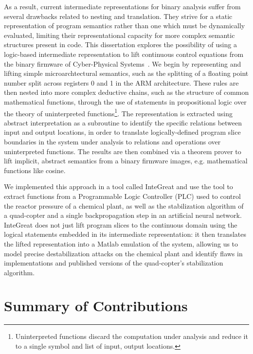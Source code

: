 As a result, current intermediate representations for binary analysis suffer from several drawbacks related to nesting and translation.
They strive for a static representation of program semantics rather than one which must be dynamically evaluated, limiting their representational capacity for more complex semantic structures present in code.
This dissertation explores the possibility of using a logic-based intermediate representation to lift continuous control equations from the binary firmware of Cyber-Physical Systems~\cite{letichevsky2017cyber}.
We begin by representing and lifting simple microarchtectural semantics, such as the splitting of a floating point number split across registers 0 and 1 in the ARM architecture.
These rules are then nested into more complex deductive chains, such as the structure of common mathematical functions, through the use of statements in propositional logic over the theory of uninterpreted functions\footnote{Uninterpreted functions discard the computation under analysis and reduce it to a single symbol and list of input, output locations.}.
The representation is extracted using abstract interpretation as a subroutine to identify the specific relations between input and output locations, in order to translate logically-defined program slice boundaries in the system under analysis to relations and operations over uninterpreted functions.
The results are then combined via a theorem prover to lift implicit, abstract semantics from a binary firmware images, e.g. mathematical functions like cosine.

We implemented this approach in a tool called InteGreat and use the tool to extract functions from a Programmable Logic Controller (PLC) used to control the reactor pressure of a chemical plant, as well as the stabilization algorithm of a quad-copter and a single backpropagation step in an artificial neural network.
InteGreat does not just lift program slices to the continuous domain using the logical statements embedded in its intermediate representation: it then translates the lifted representation into a Matlab emulation of the system, allowing us to model precise destabilization attacks on the chemical plant and identify flaws in implementations and published versions of the quad-copter's stabilization algorithm.

\section{Summary of Contributions}

